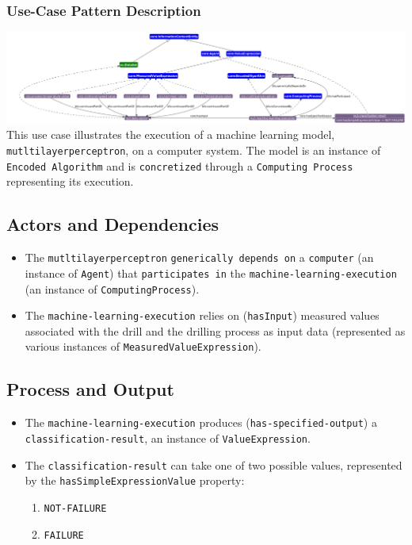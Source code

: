 \subsubsection*{Use-Case Pattern Description}

\includegraphics[scale=0.23]{scenarios/algorithm-execution/images/algorithm-execution-usecase1.png}
This use case illustrates the execution of a machine learning model, \texttt{mutltilayerperceptron}, on a computer system. The model is an instance of \texttt{Encoded Algorithm} and is \texttt{concretized} through a \texttt{Computing Process} representing its execution.

\subsection*{Actors and Dependencies}  
\begin{itemize}
    \item The \texttt{mutltilayerperceptron}  \texttt{generically depends on} a \texttt{computer} (an instance of \texttt{Agent}) that \texttt{participates in} the \texttt{machine-learning-execution} (an instance of \texttt{ComputingProcess}).
    \item The \texttt{machine-learning-execution} relies on (\texttt{hasInput}) measured values associated with the drill and the drilling process as input data (represented as various instances of \texttt{MeasuredValueExpression}).
\end{itemize}

\subsection*{Process and Output}  
\begin{itemize}
    \item The \texttt{machine-learning-execution} produces (\texttt{has-specified-output}) a \texttt{classification-result}, an instance of \texttt{ValueExpression}.
    \item The \texttt{classification-result} can take one of two possible values, represented by the \texttt{hasSimpleExpressionValue} property:
    \begin{enumerate}
        \item \texttt{NOT-FAILURE}
        \item \texttt{FAILURE}
    \end{enumerate}
\end{itemize}

